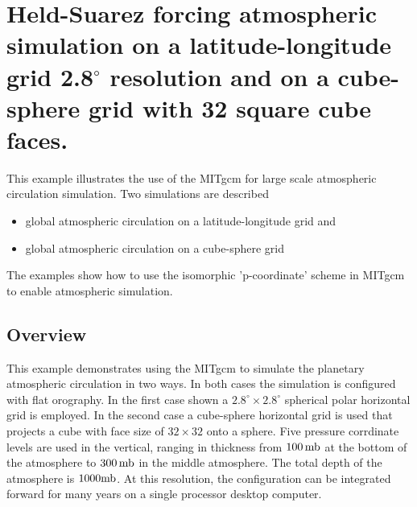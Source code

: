 
\section[Held-Suarez Atmosphere MITgcm Example]{Held-Suarez forcing atmospheric simulation on a latitude-longitude grid 2.8$^\circ$ resolution and on
a cube-sphere grid with 32 square cube faces.}
\label{www:tutorials}
\label{sect:eg-hs}


%
%

This example illustrates the use of the MITgcm for large scale atmospheric 
circulation simulation. Two simulations are described
\begin{itemize}
\item global atmospheric circulation on a latitude-longitude grid and 
\item global atmospheric circulation on a cube-sphere grid
\end{itemize}
The examples show how to use the isomorphic 'p-coordinate' scheme in
MITgcm to enable atmospheric simulation.



\subsection{Overview}
\label{www:tutorials}

This example demonstrates using the MITgcm to simulate
the planetary atmospheric circulation in two ways.
In both cases the simulation is configured with flat orography.
In the first case shown a $2.8^{\circ} \times 2.8^{\circ}$ spherical polar 
horizontal grid is employed. In the second case a cube-sphere horizontal
grid is used that projects a cube with face size of $32 \times 32$ onto a
sphere.
Five pressure corrdinate levels are used in the vertical, ranging in thickness
from $100\,{\rm mb}$ at the bottom of the atmosphere to $300\,{\rm mb}$ in the middle atmosphere.
The total depth of the atmosphere is $1000{\rm mb}$.
At this resolution, the configuration can be integrated forward for many years on a 
single processor desktop computer.
\\

